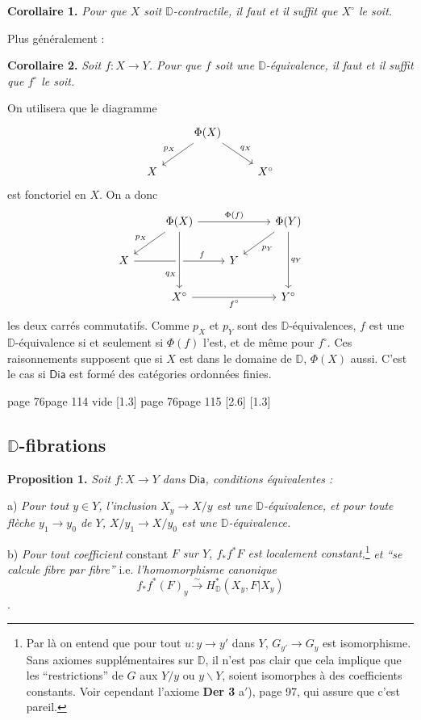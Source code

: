 \documentclass[11pt,leqno]{article}
\newcommand{\printedpage}[1]{\marginnote{\scriptsize\sffamily ed.\ #1}}
\newcommand{\msp}[1]{%
  \begingroup\def\thismsp{#1}\def\blankmsp{page 114 vide}%
  \ifx\thismsp\blankmsp
    \marginnote{\scriptsize\sffamily [114: vide]}[1.3\baselineskip]%
  \else\def\followingmsp{page 115}%
    \ifx\thismsp\followingmsp
      \marginnote{\scriptsize\sffamily [page 115]}[2.6\baselineskip]%
    \else\marginnote{\scriptsize\sffamily [#1]}[1.3\baselineskip]\fi
  \fi\endgroup}
\newcommand{\Dia}{\ensuremath{\mathsf{Dia}}}
\newcommand{\D}{\ensuremath{\mathbb{D}}}
\newcommand{\bs}{\backslash}
\begin{document}
\textbf{Corollaire 1.} \textit{Pour que $X$ soit $\D$-contractile, il faut et il suffit que $X^\circ$ le soit.}

\hspace*{\parindent}Plus généralement :

\textbf{Corollaire 2.} \textit{Soit $f : X \to Y$. Pour que $f$ soit une $\D$-équivalence, il faut et il suffit que $f^\circ$ le soit.}

\hspace*{\parindent}On utilisera que le diagramme
\[
\begin{tikzcd}
& \Phi(X) \arrow[dl, "p_X"'] \arrow[dr, "q_X"] & \\
X & & X^\circ
\end{tikzcd}
\]
est fonctoriel en $X$. On a donc
\[
\begin{tikzcd}
& \Phi(X) \arrow[rr, "\Phi(f)"] \arrow[dl, "p_X"'] & & \Phi(Y) \arrow[dl, "p_Y"] \arrow[dd, "q_Y"] \\
X \arrow[rr, "f" near end] \arrow[from=1-2, to=3-2, "q_X"' near end, crossing over] & & Y & \\
& X^\circ \arrow[rr, "f^\circ"'] & & Y^\circ
\end{tikzcd}
\]
les deux carrés commutatifs. Comme $p_X$ et $p_Y$ sont des $\D$-équivalences, $f$ est une $\D$-équivalence si et seulement si $\Phi(f)$ l'est, et de même pour $f^\circ$. Ces raisonnements supposent que si $X$ est dans le domaine de $\D$, $\Phi(X)$ aussi. C'est le cas si \Dia{} est formé des catégories ordonnées finies.

\printedpage{46}
\msp{page 76}

\subsection*{$\D$-fibrations}

\textbf{Proposition 1.} \textit{Soit $f : X \to Y$ dans} \Dia\textit{, conditions équivalentes :}

\hspace*{\parindent}a) \textit{Pour tout $y \in Y$, l'inclusion $X_y \to X/y$ est une $\D$-équivalence, et pour toute flèche $y_1 \to y_0$ de $Y$, $X/y_1 \to X/y_0$ est une $\D$-équivalence.}

\hspace*{\parindent}b) \textit{Pour tout coefficient} constant \textit{$F$ sur $Y$, $f_*f^*F$ est localement constant,}\footnote[33]{Par là on entend que pour tout $u : y \to y'$ dans $Y$, $G_{y'} \to G_y$ est isomorphisme. Sans axiomes supplémentaires sur $\D$, il n'est pas clair que cela implique que les ``restrictions'' de $G$ aux $Y/y$ ou $y\bs Y$, soient isomorphes à des coefficients constants. Voir cependant l'axiome \textbf{Der 3} a$'$), page 97, qui assure que c'est pareil.} \textit{et ``se calcule fibre par fibre''} i.e. \textit{l'homomorphisme canonique}
\[
f_*f^*(F)_y \overset{\sim}{\longrightarrow} H^*_{\D}(X_y, F|X_y)
\]
.
\end{document}
